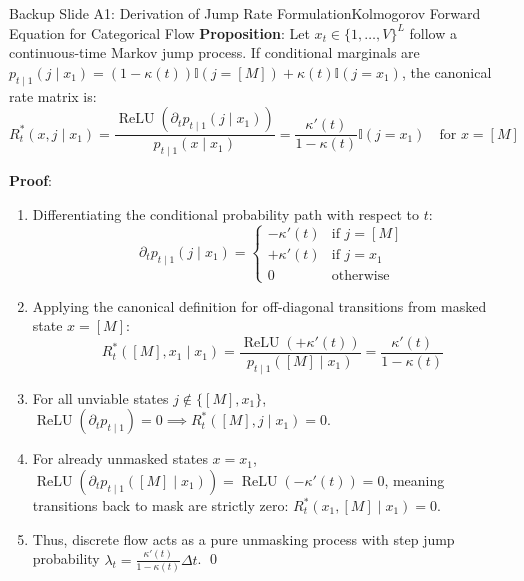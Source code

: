 \documentclass[aspectratio=169, 10pt]{beamer}
\begin{document}
\appendix

\begin{frame}{Backup Slide A1: Derivation of Jump Rate Formulation}{Kolmogorov Forward Equation for Categorical Flow}
\scriptsize
\textbf{Proposition}: Let $x_t \in \{1, \dots, V\}^L$ follow a continuous-time Markov jump process. If conditional marginals are $p_{t \mid 1}(j \mid x_1) = (1-\kappa(t))\mathbb{I}(j=[M]) + \kappa(t)\mathbb{I}(j=x_1)$, the canonical rate matrix is:
\begin{equation*}
  R_t^*(x, j \mid x_1) = \frac{\operatorname{ReLU}(\partial_t p_{t \mid 1}(j \mid x_1))}{p_{t \mid 1}(x \mid x_1)} = \frac{\kappa'(t)}{1 - \kappa(t)} \mathbb{I}(j = x_1) \quad \text{for } x = [M]
\end{equation*}

\textbf{Proof}:
\begin{enumerate}\setlength{\itemsep}{1pt}\tiny
  \item Differentiating the conditional probability path with respect to $t$:
  \begin{equation*}
    \partial_t p_{t \mid 1}(j \mid x_1) = 
    \begin{cases}
      -\kappa'(t) & \text{if } j = [M] \\
      +\kappa'(t) & \text{if } j = x_1 \\
      0 & \text{otherwise}
    \end{cases}
  \end{equation*}
  \item Applying the canonical definition for off-diagonal transitions from masked state $x = [M]$:
  \begin{equation*}
    R_t^*([M], x_1 \mid x_1) = \frac{\operatorname{ReLU}(+\kappa'(t))}{p_{t \mid 1}([M] \mid x_1)} = \frac{\kappa'(t)}{1 - \kappa(t)}
  \end{equation*}
  \item For all unviable states $j \notin \{[M], x_1\}$, $\operatorname{ReLU}(\partial_t p_{t \mid 1}) = 0 \implies R_t^*([M], j \mid x_1) = 0$.
  \item For already unmasked states $x = x_1$, $\operatorname{ReLU}(\partial_t p_{t \mid 1}([M] \mid x_1)) = \operatorname{ReLU}(-\kappa'(t)) = 0$, meaning transitions back to mask are strictly zero: $R_t^*(x_1, [M] \mid x_1) = 0$.
  \item Thus, discrete flow acts as a pure unmasking process with step jump probability $\lambda_t = \frac{\kappa'(t)}{1 - \kappa(t)} \Delta t$. \qed
\end{enumerate}
\end{frame}
\end{document}
